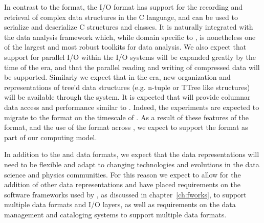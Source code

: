 \documentclass[../main-v1.tex]{subfiles}
\begin{document}
In contrast to the  format,
the  I/O format has support for the recording and retrieval of complex data structures in the  C\raisebox{1pt}{++} language, and can be used to serialize and deserialize  C\raisebox{1pt}{++} structures and classes.  It 
is naturally
integrated with the  data analysis framework which, while domain specific to , is nonetheless one of the largest and most robust toolkits for  data analysis.  We also expect that support for parallel I/O within the  I/O systems will be expanded greatly by the time of the  era, and that the parallel reading and writing of compressed data will be supported.  Similarly we expect that in the  era, new organization and representations of tree'd data structures (e.g. n-tuple or TTree like structures) will be available through the  system\cite{Blomer:2020usr, ROOTTeam:2020jal}. It is expected that  will provide columnar data access and performance similar to . Indeed, the  experiments are expected to migrate to the  format on the timescale of .
As a result of these features of the format, and the use of the format across , we expect to support the  format as part of our computing model. 

In addition to the  and  data formats, we expect that the  data representations will need to be flexible and adapt to changing technologies and evolutions in the data science and physics communities.  For this reason we expect to allow for the addition of other data representations and have placed requirements on the software frameworks used by , as discussed in chapter~\ref{ch:fworks}, to support multiple data formats and I/O layers, as well as requirements on the data management and cataloging systems to support multiple data formats.

\end{document}
